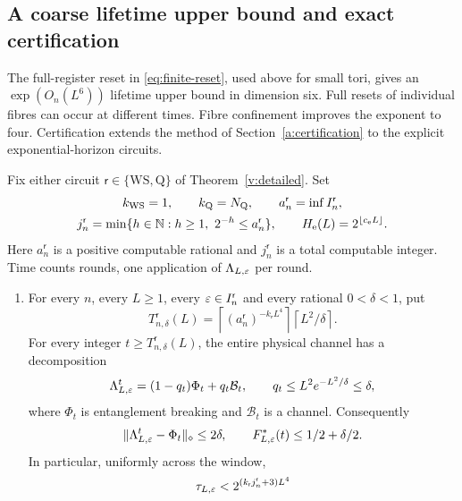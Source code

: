 \subsection{A coarse lifetime upper bound and exact certification}\label{v:cert-section}
The full-register reset in \eqref{eq:finite-reset}, used above for
small tori, gives an \(\exp(O_n(L^6))\) lifetime upper bound
in dimension six. Full resets of individual fibres can occur at different times. Fibre confinement improves the exponent to four. Certification extends the method of
Section~\ref{a:certification} to the explicit exponential-horizon
circuits.

\begin{proposition}\label{v:certification}
Fix either circuit \(\mathsf r\in\{\mathrm{WS},\mathrm Q\}\) of
Theorem~\ref{v:detailed}. Set
\[
\begin{gathered}
 k_{\mathrm{WS}}=1,\qquad k_{\mathrm Q}=N_{\mathrm Q},\qquad
 a_n^{\mathsf r}=\inf I_n^{\mathsf r},\\
 j_n^{\mathsf r}=\min\{h\in\mathbb N:h\ge1,\ 2^{-h}\le a_n^{\mathsf r}\},\qquad
 H_{\mathrm e}(L)=2^{\lfloor c_{\mathrm e}L\rfloor}.
\end{gathered}
\]
Here \(a_n^{\mathsf r}\) is a positive computable rational and
\(j_n^{\mathsf r}\) is a total computable integer. Time counts rounds,
one application of \(\Lambda_{L,\varepsilon}\) per round.
\begin{enumerate}
\item For every \(n\), every \(L\ge1\), every \(\varepsilon\in I_n^{\mathsf r}\)
and every rational \(0<\delta<1\), put
\begin{equation}\label{v:reset-time}
 T^{\mathsf r}_{n,\delta}(L)=
 \left\lceil(a_n^{\mathsf r})^{-k_{\mathsf r}L^4}\right\rceil
 \left\lceil L^2/\delta\right\rceil.
\end{equation}
For every integer \(t\ge T^{\mathsf r}_{n,\delta}(L)\), the entire
physical channel has a decomposition
\begin{equation}\label{v:reset-mixture}
 \Lambda_{L,\varepsilon}^t=(1-q_t)\Phi_t+q_t\mathcal B_t,
 \qquad q_t\le L^2e^{-L^2/\delta}\le\delta,
\end{equation}
where \(\Phi_t\) is entanglement breaking and \(\mathcal B_t\) is a
channel. Consequently
\[
 \|\Lambda_{L,\varepsilon}^t-\Phi_t\|_\diamond\le2\delta,
 \qquad F^*_{L,\varepsilon}(t)\le1/2+\delta/2.
\]
In particular, uniformly across the window,
\begin{equation}\label{v:lifetime-upper}
 \tau_{L,\eps}<2^{(k_{\mathsf r}j_n^{\mathsf r}+3)L^4}

\end{equation}
\end{enumerate}
\end{proposition}
